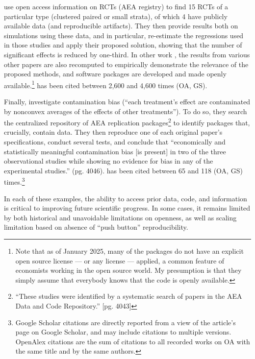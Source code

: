 \documentclass{Revue-economique}
\newcommand{\citep}{\parencite}
\newcommand{\citet}{\textcite}
\begin{document}
\begin{Article} [%
	Titre={Reproducibility and Open Science in Economics},
	Auteur={Lars Vilhuber\thanks{Cornell University, lars.vilhuber@cornell.edu}}]
\begin{refsection}[Main]
\citet{de_chaisemartin_at_2024} use open access information on RCTs (AEA registry) to find 15 RCTs of a particular type (clustered paired or small strata), of which 4 have publicly available data (and reproducible artifacts). They then provide results both on simulations using these data, and in particular, re-estimate the regressions used in those studies and apply their proposed solution, showing that the number of significant effects is reduced by one-third. In other work \citep{de_chaisemartin_two-way_2020,de_chaisemartin_difference--differences_2024}, the results from various other papers are also recomputed to empirically demonstrate the relevance of the proposed methods, and software packages \citep[e.g.][]{de_chaisemartin_chaisemartinpackagesdid_multiplegt_dyn_2025} are developed and made openly available.\footnote{Note that as of January 2025, many of the packages do not have an explicit open source license --- or any license --- applied, a common feature of economists working in the open source world. My presumption is that they simply assume that everybody knows that the code is openly available.} \citet{de_chaisemartin_two-way_2020} has been cited between 2,600 and 4,600 times (OA, GS).


Finally, \citet{goldsmith-pinkham_contamination_2024} investigate contamination bias (``each treatment’s effect are contaminated by nonconvex averages of the effects of other treatments''). To do so, they search the centralized repository of AEA replication packages\footnote{``These studies were identified by a systematic search of papers in the AEA Data and Code Repository.'' [pg. 4043]} to identify  packages that, crucially, contain data. They then reproduce one of each original paper's specifications, conduct several tests, and conclude that ``economically and statistically meaningful contamination bias [is present] in two of the three observational studies while showing no evidence for bias in any of the experimental studies.'' (pg. 4046). \citet{goldsmith-pinkham_contamination_2024}  has been cited between 65 and 118 (OA, GS) times.\footnote{Google Scholar citations are directly reported from a view of the article's page on Google Scholar, and may include citations to multiple versions. OpenAlex citations are the sum of citations to all recorded works on OA with the same title and by the same authors.}

In each of these examples, the ability to access prior data, code, and information is critical to improving future scientific progress. In some cases, it remains limited by both historical and unavoidable limitations on openness, as well as scaling limitation based on absence of ``push button'' reproducibility.



\end{refsection}
\end{Article}
\end{document}
